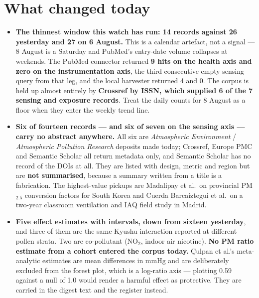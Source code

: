 \documentclass[10pt]{article}
\begin{document}
\section*{\sffamily\bfseries\color{Deep}What changed today}
\vspace{-1.5mm}{\color{Amber}\rule{\linewidth}{1.1pt}}\vspace{2.5mm}

\footnotesize
\begin{itemize}
\item \textbf{The thinnest window this watch has run: 14 records against 26 yesterday
and 27 on 6 August.} This is a calendar artefact, not a signal --- 8 August is a Saturday
and PubMed's entry-date volume collapses at weekends. The PubMed connector returned
\textbf{9 hits on the health axis and zero on the instrumentation axis}, the third
consecutive empty sensing query from that leg, and the local harvester returned 4 and 0.
The corpus is held up almost entirely by \textbf{Crossref by ISSN, which supplied 6 of
the 7 sensing and exposure records}. Treat the daily counts for 8 August as a floor when
they enter the weekly trend line.

\item \textbf{Six of fourteen records --- and six of seven on the sensing axis --- carry no
abstract anywhere.} All six are \textit{Atmospheric Environment} / \textit{Atmospheric
Pollution Research} deposits made today; Crossref, Europe PMC and Semantic Scholar all
return metadata only, and Semantic Scholar has no record of the DOIs at all. They are
listed with design, metric and region but are \textbf{not summarised}, because a summary
written from a title is a fabrication. The highest-value pickups are Madalipay et al.\ on
provincial PM$_{2.5}$ conversion factors for South Korea and Cuerda Barcaiztegui et al.\
on a two-year classroom ventilation and IAQ field study in Madrid.

\item \textbf{Five effect estimates with intervals, down from sixteen yesterday}, and
three of them are the same Kyushu interaction reported at different pollen strata.
Two are co-pollutant (NO$_2$, indoor air nicotine). \textbf{No PM ratio estimate from a
cohort entered the corpus today.} Çulpan et al.'s meta-analytic estimates are mean
differences in mmHg and are deliberately excluded from the forest plot, which is a
log-ratio axis --- plotting 0.59 against a null of 1.0 would render a harmful effect as
protective. They are carried in the digest text and the register instead.


\end{itemize}
\end{document}
